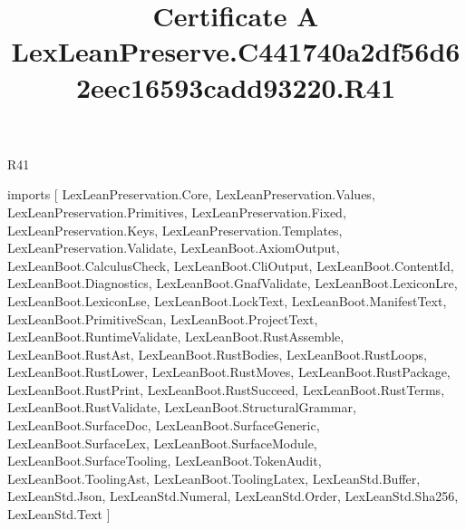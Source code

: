 \begin{lexlean}{R41}
\title{Certificate A LexLeanPreserve.C441740a2df56d62eec16593cadd93220.R41}
\begin{coremodule}
imports [
  LexLeanPreservation.Core,
  LexLeanPreservation.Values,
  LexLeanPreservation.Primitives,
  LexLeanPreservation.Fixed,
  LexLeanPreservation.Keys,
  LexLeanPreservation.Templates,
  LexLeanPreservation.Validate,
  LexLeanBoot.AxiomOutput,
  LexLeanBoot.CalculusCheck,
  LexLeanBoot.CliOutput,
  LexLeanBoot.ContentId,
  LexLeanBoot.Diagnostics,
  LexLeanBoot.GnafValidate,
  LexLeanBoot.LexiconLre,
  LexLeanBoot.LexiconLse,
  LexLeanBoot.LockText,
  LexLeanBoot.ManifestText,
  LexLeanBoot.PrimitiveScan,
  LexLeanBoot.ProjectText,
  LexLeanBoot.RuntimeValidate,
  LexLeanBoot.RustAssemble,
  LexLeanBoot.RustAst,
  LexLeanBoot.RustBodies,
  LexLeanBoot.RustLoops,
  LexLeanBoot.RustLower,
  LexLeanBoot.RustMoves,
  LexLeanBoot.RustPackage,
  LexLeanBoot.RustPrint,
  LexLeanBoot.RustSucceed,
  LexLeanBoot.RustTerms,
  LexLeanBoot.RustValidate,
  LexLeanBoot.StructuralGrammar,
  LexLeanBoot.SurfaceDoc,
  LexLeanBoot.SurfaceGeneric,
  LexLeanBoot.SurfaceLex,
  LexLeanBoot.SurfaceModule,
  LexLeanBoot.SurfaceTooling,
  LexLeanBoot.TokenAudit,
  LexLeanBoot.ToolingAst,
  LexLeanBoot.ToolingLatex,
  LexLeanStd.Buffer,
  LexLeanStd.Json,
  LexLeanStd.Numeral,
  LexLeanStd.Order,
  LexLeanStd.Sha256,
  LexLeanStd.Text
]


\end{coremodule}
\end{lexlean}
